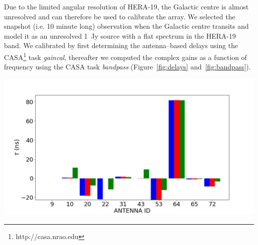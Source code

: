 \documentclass[a0,portrait]{a0poster}
\begin{document}
\begin{multicols}{2}
Due to the limited angular resolution of HERA-19, the Galactic centre is almost unresolved and can therefore be used to calibrate the array.
We selected the snapshot (i.e. 10 minute long) observation when the Galactic centre transits and model it as an unresolved 1~Jy source with a flat spectrum in the HERA-19 band. We calibrated by first determining the antenna--based delays using the CASA\footnote{http://casa.nrao.edu} task {\it gaincal}, thereafter we computed the complex gains as a function of frequency using the CASA task {\it bandpass} (Figure~\ref{fig:delays} and~\ref{fig:bandpass}).
\begin{center}\vspace{1cm}
\includegraphics[width=0.8\linewidth]{delay.png}
\label{fig:delays}
\end{center}\vspace{1cm}
%
\begin{minipage}{\columnwidth}
    \makeatletter
    \newcommand{\@captype}{figure}
    \makeatother
    \centering
\end{minipage}
\end{multicols}
\end{document}
